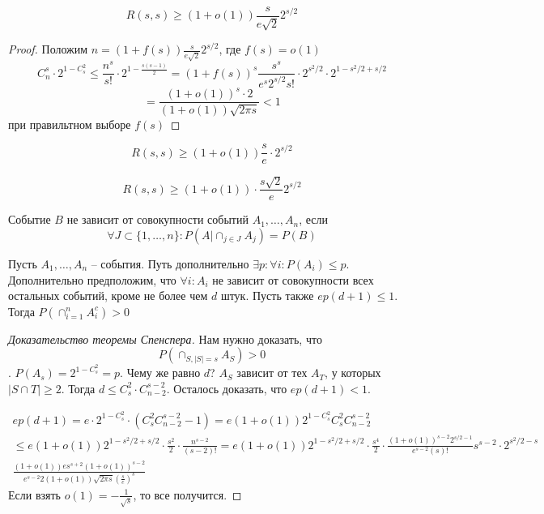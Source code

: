 \documentclass[document.tex]{subfiles}
\begin{document}
\begin{corollary}
	$$R(s, s) \geq (1+o(1))\frac{s}{e\sqrt{2}} 2^{s/2}$$
\end{corollary}
\begin{proof}
	Положим $n = (1+f(s)) \frac{s}{e\sqrt{2}}2^{s/2}$, где $f(s) = o(1)$
	$$C_n^s \cdot 2^{1 - C_s^2} \leq \frac{n^s}{s!} \cdot 2^{1 - \frac{s(s-1)}{2}} = (1+f(s))^s \frac{s^s}{e^s 2^{s/2}s!} \cdot 2^{s^2/2} \cdot 2^{1 - s^2/2 + s/2}$$
	$$= \frac{(1 + o(1))^s \cdot 2}{(1+o(1)) \sqrt{2 \pi s}} < 1$$
	при правильтном выборе $f(s)$

\end{proof}

\begin{theorem}[Эрдеша]
	$$R(s, s) \geq (1+o(1)) \frac{s}{e} \cdot 2^{s/2}$$
\end{theorem}

\begin{theorem}[Спенсера]
	$$R(s, s) \geq (1+o(1)) \cdot \frac{s\sqrt{2}}{e} 2^{s/2}$$

\end{theorem}

\begin{definition}
	Событие $B$ не зависит от совокупности событий $A_1, \ldots, A_n$, если $$\forall J \subset \{1, \ldots, n\}: P(A | \cap_{j \in J} A_j) = P(B)$$
\end{definition}

\begin{lemma}
	Пусть $A_1, \ldots, A_n$ -- события. Путь дополнительно $\exists p : \forall i : P(A_i) \leq p$. Дополнительно предположим, что $\forall i : A_i$ не зависит от совокупности всех остальных событий, кроме не более чем $d$ штук. Пусть также $ep(d+1) \leq 1$. Тогда $P(\cap_{i=1}^nA_i^c) > 0$
\end{lemma}

\begin{proof}[Доказательство теоремы Спенспера]
	Нам нужно доказать, что $$P(\cap_{S, |S| = s} A_S) > 0$$. $P(A_s) = 2^{1 - C_s^2} = p$. Чему же равно $d$? $A_S$ зависит от тех $A_T$, у которых $|S \cap T| \geq 2$. Тогда $d \leq C_s^2 \cdot C_{n-2}^{s-2}$. Осталось доказать, что $ep(d+1) < 1$.

	\begin{multline*}
		ep(d+1) = e \cdot 2^{1 - C_s^2} \cdot (C_s^2 C_{n-2}^{s-2} - 1) = e(1+o(1))2^{1 - C_s^2}C_s^2C_{n-2}^{s-2} \\
		\leq e (1+o(1)) 2^{1 - s^2/2 + s/2} \cdot \frac{s^2}{2} \cdot \frac{n^{s-2}}{(s-2)!} = e (1+o(1)) 2^{1 - s^2/2 + s/2} \cdot \frac{s^4}{2} \cdot \frac{(1+o(1))^{s-2} 2^{s/2 - 1} }{e^{s-2}(s)!}s^{s-2}\cdot 2^{s^2/2-s} \\
		\frac{(1+o(1))es^{s+2}(1+o(1))^{s-2}}{e^{s-2}2(1+o(1))\sqrt{2 \pi s} \left(\frac{s}{e}\right)^{s}}
	\end{multline*}
Если взять $o(1) = -\frac{1}{\sqrt{s}}$, то все получится.
\end{proof}
\end{document}
